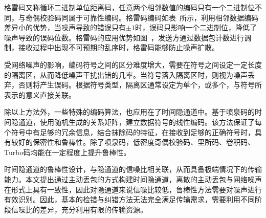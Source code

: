 
格雷码又称循环二进制单位距离码，任意两个相邻数值的编码只有一个二进制位不同，与奇偶校验码同属于可靠性编码。格雷码编码如表\ 所示，利用相邻数据编码差异小的优势，当噪声导致的错误只有$\pm1$时，误码只影响一个二进制位，降低了噪声导致的误码位数。格雷码的应用优势如图\ ，发送方通过数据包计数进行调制，接收过程中出现不可预期的乱序时，格雷码能够防止噪声扩散。

受网络噪声的影响，编码符号之间的区分难度增大，需要在符号之间设定一定长度的隔离区，从而降低噪声干扰出错的几率。当符号落入隔离区时，则视为噪声丢弃，否则将产生误码。根据符号类型，隔离区通常设定为单个，或多个，与符号所表示的意义直接关联。

除以上方法外，一些特殊的编码算法，也应用在了时间隐通道中。基于喷泉码的时间隐通道，使用随机生成的关系矩阵，建立数据符号的线性编码。该方法保证了每个符号中有足够的冗余信息，结合抹除码的特征，在接收到足够的正确符号时，具有较好的保密性和鲁棒性。除了喷泉码，低密度奇偶校验码、里所码、卷积码、Turbo码均能在一定程度上提升鲁棒性。

时间隐通道的鲁棒性设计，与隐通道的信噪比相关联，从而具备极端情况下的传输能力。本文提出通过主动丢包的方式构建时间隐通道，离散的主动丢包与网络噪声在形式上具有一致性，因此对隐通道来说信噪比较低，鲁棒性方法需要对噪声进行有效识别。因此，基本的检错与纠错方法无法完全满足传输需求，需要利用不同阶段信噪比的差异，充分利用有限的传输资源。